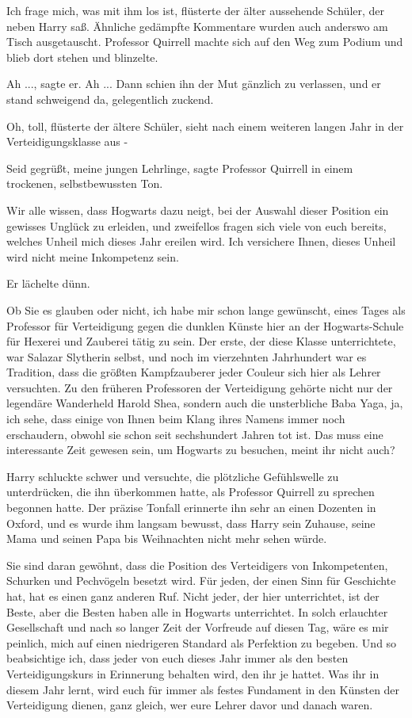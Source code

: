 \glqq{}Ich frage mich, was mit ihm los ist\grqq{}, flüsterte der älter
aussehende Schüler, der neben Harry saß. Ähnliche gedämpfte Kommentare wurden
auch anderswo am Tisch ausgetauscht. Professor Quirrell machte sich auf den Weg
zum Podium und blieb dort stehen und blinzelte.

\glqq{}Ah ...\grqq{}, sagte er. \glqq{}Ah ...\grqq{} Dann schien ihn der Mut
gänzlich zu verlassen, und er stand schweigend da, gelegentlich zuckend.

\glqq{}Oh, toll\grqq{}, flüsterte der ältere Schüler, \glqq{}sieht nach einem
weiteren langen Jahr in der Verteidigungsklasse aus -\grqq{}

\glqq{}Seid gegrüßt, meine jungen Lehrlinge\grqq{}, sagte Professor Quirrell in
einem trockenen, selbstbewussten Ton.

\glqq{}Wir alle wissen, dass Hogwarts dazu neigt, bei der Auswahl dieser
Position ein gewisses Unglück zu erleiden, und zweifellos fragen sich viele von
euch bereits, welches Unheil mich dieses Jahr ereilen wird. Ich versichere
Ihnen, dieses Unheil wird nicht meine Inkompetenz sein.\grqq{}

Er lächelte dünn.

\glqq{}Ob Sie es glauben oder nicht, ich habe mir schon lange gewünscht, eines
Tages als Professor für Verteidigung gegen die dunklen Künste hier an der
Hogwarts-Schule für Hexerei und Zauberei tätig zu sein. Der erste, der diese
Klasse unterrichtete, war Salazar Slytherin selbst, und noch im vierzehnten
Jahrhundert war es Tradition, dass die größten Kampfzauberer jeder Couleur sich
hier als Lehrer versuchten. Zu den früheren Professoren der Verteidigung gehörte
nicht nur der legendäre Wanderheld Harold Shea, sondern auch die unsterbliche
Baba Yaga, ja, ich sehe, dass einige von Ihnen beim Klang ihres Namens immer
noch erschaudern, obwohl sie schon seit sechshundert Jahren tot ist. Das muss
eine interessante Zeit gewesen sein, um Hogwarts zu besuchen, meint ihr nicht
auch?\grqq{}

Harry schluckte schwer und versuchte, die plötzliche Gefühlswelle zu
unterdrücken, die ihn überkommen hatte, als Professor Quirrell zu sprechen
begonnen hatte. Der präzise Tonfall erinnerte ihn sehr an einen Dozenten in
Oxford, und es wurde ihm langsam bewusst, dass Harry sein Zuhause, seine Mama und
seinen Papa bis Weihnachten nicht mehr sehen würde.

\glqq{}Sie sind daran gewöhnt, dass die Position des Verteidigers von
Inkompetenten, Schurken und Pechvögeln besetzt wird. Für jeden, der einen Sinn
für Geschichte hat, hat es einen ganz anderen Ruf. Nicht jeder, der hier
unterrichtet, ist der Beste, aber die Besten haben alle in Hogwarts
unterrichtet. In solch erlauchter Gesellschaft und nach so langer Zeit der
Vorfreude auf diesen Tag, wäre es mir peinlich, mich auf einen niedrigeren
Standard als Perfektion zu begeben. Und so beabsichtige ich, dass jeder von euch
dieses Jahr immer als den besten Verteidigungskurs in Erinnerung behalten wird,
den ihr je hattet. Was ihr in diesem Jahr lernt, wird euch für immer als festes
Fundament in den Künsten der Verteidigung dienen, ganz gleich, wer eure Lehrer
davor und danach waren.\grqq{}

